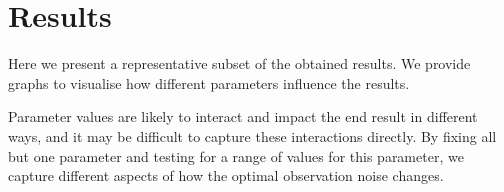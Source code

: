 \newcommand{\exsetup}[5]{%
    \begin{tabular}{lll}
        \toprule
        \multirow{2}{*}{Best arm}   & $\mu$    & #1 \\
                                    & $\sigma$ & #2 \\
        \multirow{2}{*}{Other arms} & $\mu$    & #3 \\
                                    & $\sigma$ & #4 \\
        \multicolumn{2}{l}{Number of arms}     & #5 \\
        \bottomrule
    \end{tabular}}


\newcommand{\ob}{$\sigma_{ob}$}

\newcommand{\gooresetup}[2]{%
	\begin{tabular}{ll}
		\toprule
		Ratio & #1 \\
		Number of players & #2 \\
		\bottomrule
	\end{tabular}}

\chapter{Results}
\label{ch:results}

Here we present a representative subset of the obtained results.
We provide graphs to visualise how different parameters influence the results.

Parameter values are likely to interact and impact the end result in different ways, and it may be difficult to capture these interactions directly.
By fixing all but one parameter and testing for a range of values for this parameter, we capture different aspects of how the optimal observation noise changes.

